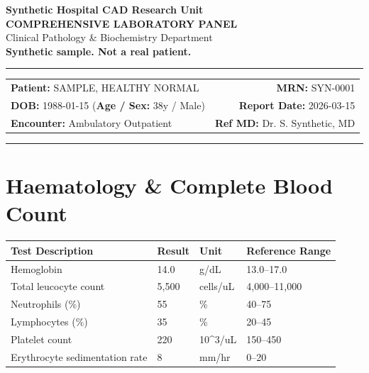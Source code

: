 \documentclass[10pt,a4paper]{article}
\begin{document}
\begin{center}
  {\Large \textbf{Synthetic Hospital CAD Research Unit}}\\
  \vspace{2pt}
  {\normalsize \textbf{COMPREHENSIVE LABORATORY PANEL}}\\
  \vspace{1pt}
  {\footnotesize \textcolor{subtext}{Clinical Pathology \& Biochemistry Department}}\\
  \vspace{4pt}
  {\small \textbf{\textcolor{red!75!black}{Synthetic sample. Not a real patient.}}}\\
  \vspace{3pt}
  \textcolor{linecolor}{\rule{\textwidth}{0.8pt}}
\end{center}

\vspace{2pt}

\noindent
\begin{tabular*}{\textwidth}{@{} l @{\extracolsep{\fill}} r @{}}
  \textbf{Patient:} SAMPLE, HEALTHY NORMAL & \textbf{MRN:} SYN-0001 \\
  \textbf{DOB:} 1988-01-15 \quad (\textbf{Age / Sex:} 38y / Male) & \textbf{Report Date:} 2026-03-15 \\
  \textbf{Encounter:} Ambulatory Outpatient & \textbf{Ref MD:} Dr. S. Synthetic, MD \\
\end{tabular*}

\vspace{2pt}
\noindent\textcolor{linecolor}{\rule{\textwidth}{0.4pt}}
\vspace{6pt}


\section*{Haematology \& Complete Blood Count}

\begin{tabular}{@{} p{6.4cm} p{2.5cm} p{2.5cm} p{3.1cm} @{}}
  \toprule
  \textbf{Test Description} & \textbf{Result} & \textbf{Unit} & \textbf{Reference Range} \\
  \midrule
  Hemoglobin & 14.0 & g/dL & 13.0--17.0 \\
  Total leucocyte count & 5,500 & cells/uL & 4,000--11,000 \\
  Neutrophils (\%) & 55 & \% & 40--75 \\
  Lymphocytes (\%) & 35 & \% & 20--45 \\
  Platelet count & 220 & 10\textasciicircum 3/uL & 150--450 \\
  Erythrocyte sedimentation rate & 8 & mm/hr & 0--20 \\
  \bottomrule
\end{tabular}
\end{document}
